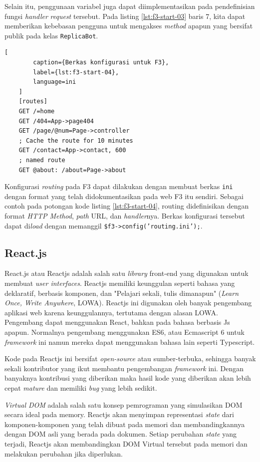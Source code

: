     Selain itu, penggunaan variabel juga dapat diimplementasikan pada pendefinisian fungsi \textit{handler} \textit{request} tersebut. Pada listing \ref{lst:f3-start-03} baris 7, kita dapat memberikan kebebasan pengguna untuk mengakses \textit{method} apapun yang bersifat publik pada kelas \texttt{ReplicaBot}.
    \begin{lstlisting}[
        caption={Berkas konfigurasi untuk F3},
        label={lst:f3-start-04},
        language=ini
    ]
    [routes]
    GET /=home
    GET /404=App->page404
    GET /page/@num=Page->controller
    ; Cache the route for 10 minutes
    GET /contact=App->contact, 600
    ; named route
    GET @about: /about=Page->about
     \end{lstlisting}
     Konfigurasi \textit{routing} pada F3 dapat dilakukan dengan membuat berkas \texttt{ini} dengan format yang telah didokumentasikan pada web F3 itu sendiri. Sebagai contoh pada potongan kode listing \ref{lst:f3-start-04}, routing didefinisikan dengan format \textit{HTTP Method}, \textit{path} URL, dan \textit{handler}nya.
     Berkas konfigurasi tersebut dapat di\textit{load} dengan memanggil \texttt{\$f3->config('routing.ini');}.
     
\subsection{React.js}
    React.js atau Reactjs adalah salah satu \textit{library} front-end yang digunakan untuk membuat \textit{user interfaces}\cite{facebook:react-homepage}. Reactjs memiliki keunggulan seperti bahasa yang deklaratif, berbasis komponen, dan "Pelajari sekali, tulis dimanapun" (\textit{Learn Once, Write Anywhere}, LOWA)\cite{facebook:react-homepage}.
    Reactjs ini digunakan oleh banyak pengembang aplikasi web karena keunggulannya, tertutama dengan alasan LOWA. 
    Pengembang dapat menggunakan React, bahkan pada bahasa berbasis Js apapun. Normalnya pengembang menggunakan ES6, atau Ecmascript 6 untuk \textit{framework} ini namun mereka dapat menggunakan bahasa lain seperti Typescript.
        
    Kode pada Reactjs ini bersifat \textit{open-source} atau sumber-terbuka, sehingga banyak sekali kontributor yang ikut membantu pengembangan \textit{framework} ini. Dengan banyaknya kontribusi yang diberikan maka hasil kode yang diberikan akan lebih cepat \textit{mature} dan memiliki \textit{bug} yang lebih sedikit.

    \textit{Virtual DOM} adalah salah satu konsep pemrograman yang simulasikan DOM secara ideal pada memory\cite{facebook:react-faq}. Reactjs akan menyimpan representasi \textit{state} dari komponen-komponen yang telah dibuat pada memori dan membandingkannya dengan
    DOM asli yang berada pada dokumen. Setiap perubahan \textit{state} yang terjadi, Reactjs akan membandingkan DOM Virtual tersebut pada memori dan melakukan perubahan jika diperlukan.
    
